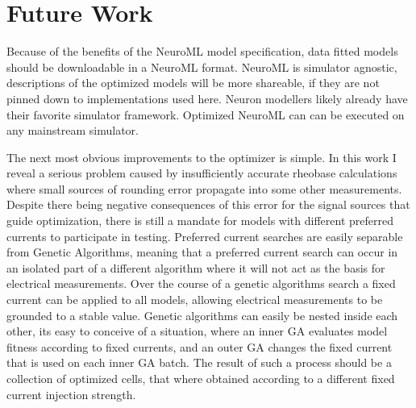 \section{Future Work}
Because of the benefits of the NeuroML model specification, data fitted models should be downloadable in a NeuroML format. NeuroML is simulator agnostic, descriptions of the optimized models will be more shareable, if they are not pinned down to implementations used here. Neuron modellers likely already have their favorite simulator framework. Optimized NeuroML can can be executed on any mainstream simulator. 

The next most obvious improvements to the optimizer is simple. In this work I reveal a serious problem caused by insufficiently accurate rheobase calculations where small sources of rounding error  propagate into some other measurements. %
Despite there being negative consequences of this error for the signal sources that guide optimization, there is still a mandate for models with different preferred currents to participate in testing. Preferred current searches are easily separable from Genetic Algorithms, meaning that a preferred current search can occur in an isolated part of a different algorithm where it will not act as the basis for electrical measurements. Over the course of a genetic algorithms search a fixed current can be applied to all models, allowing electrical measurements to be grounded to a stable value. Genetic algorithms can easily be nested inside each other, its easy to conceive of a situation, where an inner GA evaluates model fitness according to fixed currents, and an outer GA changes the fixed current that is used on each inner GA batch. The result of such a process should be a collection of optimized cells, that where obtained according to a different fixed current injection strength. %


